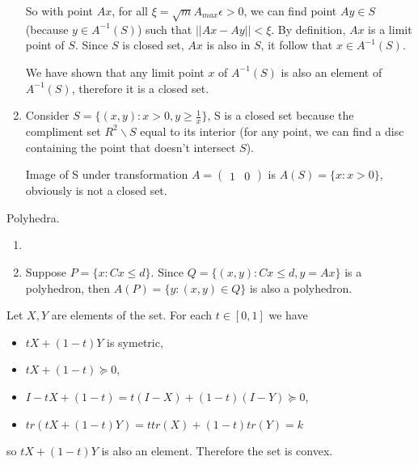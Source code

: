 \documentclass[12pt,letterpaper]{article}
\begin{document}
\begin{alphalist}
\begin{enumerate}[label=(\roman*)]
        So with point $Ax$, for all $\xi = \sqrt{m}A_{max}\epsilon>0$, we can find
        point $Ay \in S$ (because $y \in A^{-1}(S)$) such that $|| Ax - Ay || < \xi$. By definition, $Ax$
        is a limit point of $S$. Since $S$ is closed set, $Ax$ is also in $S$,
        it follow that $x \in A^{-1}(S)$.

        We have shown that any limit point $x$ of $A^{-1}(S)$ is also an
        element of $A^{-1}(S)$, therefore it is a closed set.

    \item Consider $S = \{(x, y) : x > 0, y \ge \frac{1}{x}\}$, S is a closed
        set because the compliment set $R^2 \backslash S$ equal to its interior (for any
        point, we can find a disc containing the point that doesn't intersect
        $S$).

        Image of S under transformation $A = (\begin{smallmatrix} 1 & 0
        \end{smallmatrix})$ is $A(S) = \{ x : x > 0 \}$, obviously is not a
        closed set.

\end{enumerate} %

\item Polyhedra.

\begin{enumerate}[label=(\roman*)]
    \item

    \item Suppose $P = \{x : Cx \le d\}$. Since $Q = \{ (x, y) : Cx \le d,
        y = Ax \}$ is a polyhedron, then $A(P) = \{y : (x, y) \in Q\}$ is also a
        polyhedron.
\end{enumerate}

\item Let $X, Y$ are elements of the set. For each $t \in [0, 1]$ we have
    \begin{itemize}
        \item $t X + (1 - t)Y$ is symetric,
        \item $t X + (1 - t) \succeq 0$,
        \item $I - t X + (1 - t) = t(I - X) + (1-t)(I - Y) \succeq 0$,
        \item $tr(t X + (1- t)Y) = t tr(X) + (1 - t)tr(Y) = k$
    \end{itemize}

    so $t X + (1- t)Y$ is also an element. Therefore the set is convex.



\end{alphalist}
\end{document}
